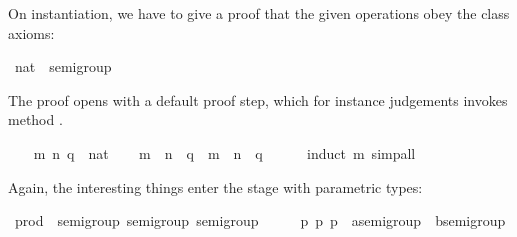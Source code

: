 \begin{isabellebody}
\begin{isamarkuptext}
On instantiation, we have to give a proof that the given operations
obey the class axioms:%
\end{isamarkuptext}%
\isamarkuptrue%
\isamarkupfalse%
\ nat\ {}{}\ semigroup\isanewline
{}\isanewline
\isanewline
{}\isamarkupfalse%
%
\isadelimproof
\ %
\endisadelimproof
%
\isatagproof
{}\isamarkupfalse%
%
\begin{isamarkuptxt}%
\noindent The proof opens with a default proof step, which for
instance judgements invokes method \hyperlink{method.intro-classes}{\mbox{}}.%
\end{isamarkuptxt}%
\isamarkuptrue%
\ \ \isamarkupfalse%
\ m\ n\ q\ {}{}\ nat\isanewline
\ \ \isamarkupfalse%
\ {}{}m\ {}\ n{}\ {}\ q\ {}\ m\ {}\ {}n\ {}\ q{}{}\isanewline
\ \ \ \ \isamarkupfalse%
\ {}induct\ m{}\ simp{}all\isanewline
{}\isamarkupfalse%
%
\endisatagproof
{\isafoldproof}%
%
\isadelimproof
%
\endisadelimproof
\isanewline
\isanewline
{}\isamarkupfalse%
%
\begin{isamarkuptext}%
\noindent Again, the interesting things enter the stage with
parametric types:%
\end{isamarkuptext}%
\isamarkuptrue%
\isamarkupfalse%
\ prod\ {}{}\ {}semigroup{}\ semigroup{}\ semigroup\isanewline
{}\isanewline
\isanewline
{}\isamarkupfalse%
%
\isadelimproof
\ %
\endisadelimproof
%
\isatagproof
{}\isamarkupfalse%
\isanewline
\ \ \isamarkupfalse%
\ p\ p\ p\ {}{}\ {}{}a{}semigroup\ {}\ {}b{}semigroup{}\isanewline

\end{isabellebody}

